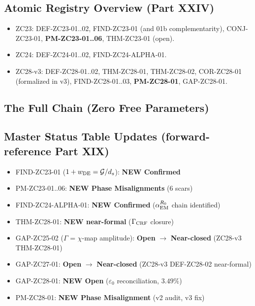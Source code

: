 \documentclass[12pt, a4paper]{article}
\begin{document}
\subsection*{Atomic Registry Overview (Part XXIV)}

\begin{itemize}[leftmargin=*, noitemsep]
\item ZC23: DEF-ZC23-01..02, FIND-ZC23-01 (and 01b complementarity),
  CONJ-ZC23-01, \textbf{PM-ZC23-01..06}, THM-ZC23-01 (open).
\item ZC24: DEF-ZC24-01..02, FIND-ZC24-ALPHA-01.
\item ZC28-v3: DEF-ZC28-01..02, THM-ZC28-01, THM-ZC28-02, COR-ZC28-01
  (formalized in v3), FIND-ZC28-01..03, \textbf{PM-ZC28-01}, GAP-ZC28-01.
\end{itemize}

\subsection*{The Full Chain (Zero Free Parameters)}

\begin{center}
\end{center}

\subsection*{Master Status Table Updates (forward-reference Part XIX)}

\begin{itemize}[leftmargin=*, noitemsep]
\item FIND-ZC23-01 ($1+w_{\rm DE} = \mathcal{G}/d_s$): \textbf{NEW Confirmed}
\item PM-ZC23-01..06: \textbf{NEW Phase Misalignments} (6 scars)
\item FIND-ZC24-ALPHA-01: \textbf{NEW Confirmed}
  ($\alpha_{\rm EM}^{R_0}$ chain identified)
\item THM-ZC28-01: \textbf{NEW near-formal} ($\Gamma_{\rm CRF}$ closure)
\item GAP-ZC25-02 ($\Gamma$ = $\chi$-map amplitude): \textbf{Open} $\to$
  \textbf{Near-closed} (ZC28-v3 THM-ZC28-01)
\item GAP-ZC27-01: \textbf{Open} $\to$ \textbf{Near-closed}
  (ZC28-v3 DEF-ZC28-02 near-formal)
\item GAP-ZC28-01: \textbf{NEW Open} ($\varepsilon_0$ reconciliation, $3.49\%$)
\item PM-ZC28-01: \textbf{NEW Phase Misalignment} (v2 audit, v3 fix)
\end{itemize}
\end{document}
